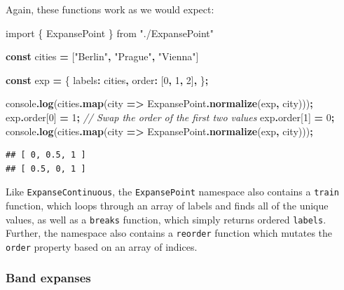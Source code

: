 \documentclass[
]{book}
\newenvironment{Shaded}{\begin{snugshade}}{\end{snugshade}}
\newcommand{\AttributeTok}[1]{\textcolor[rgb]{0.13,0.29,0.53}{#1}}
\newcommand{\BuiltInTok}[1]{#1}
\newcommand{\CommentTok}[1]{\textcolor[rgb]{0.56,0.35,0.01}{\textit{#1}}}
\newcommand{\DecValTok}[1]{\textcolor[rgb]{0.00,0.00,0.81}{#1}}
\newcommand{\FunctionTok}[1]{\textcolor[rgb]{0.13,0.29,0.53}{\textbf{#1}}}
\newcommand{\ImportTok}[1]{#1}
\newcommand{\KeywordTok}[1]{\textcolor[rgb]{0.13,0.29,0.53}{\textbf{#1}}}
\newcommand{\NormalTok}[1]{#1}
\newcommand{\OperatorTok}[1]{\textcolor[rgb]{0.81,0.36,0.00}{\textbf{#1}}}
\newcommand{\StringTok}[1]{\textcolor[rgb]{0.31,0.60,0.02}{#1}}
\theoremstyle{definition}
\theoremstyle{definition}
\theoremstyle{definition}
\theoremstyle{definition}
\theoremstyle{remark}
\begin{document}
Again, these functions work as we would expect:

\begin{Shaded}
\begin{Highlighting}[]
\ImportTok{import}\NormalTok{ \{ ExpansePoint \} }\ImportTok{from} \StringTok{"./ExpansePoint"}

\KeywordTok{const}\NormalTok{ cities }\OperatorTok{=}\NormalTok{ [}\StringTok{"Berlin"}\OperatorTok{,} \StringTok{"Prague"}\OperatorTok{,} \StringTok{"Vienna"}\NormalTok{]}

\KeywordTok{const}\NormalTok{ exp }\OperatorTok{=}\NormalTok{ \{}
\NormalTok{  labels}\OperatorTok{:}\NormalTok{ cities}\OperatorTok{,}
\NormalTok{  order}\OperatorTok{:}\NormalTok{ [}\DecValTok{0}\OperatorTok{,} \DecValTok{1}\OperatorTok{,} \DecValTok{2}\NormalTok{]}\OperatorTok{,}
\NormalTok{\}}\OperatorTok{;}

\BuiltInTok{console}\OperatorTok{.}\FunctionTok{log}\NormalTok{(cities}\OperatorTok{.}\FunctionTok{map}\NormalTok{(city }\KeywordTok{=\textgreater{}}\NormalTok{ ExpansePoint}\OperatorTok{.}\FunctionTok{normalize}\NormalTok{(exp}\OperatorTok{,}\NormalTok{ city)))}\OperatorTok{;}
\NormalTok{exp}\OperatorTok{.}\AttributeTok{order}\NormalTok{[}\DecValTok{0}\NormalTok{] }\OperatorTok{=} \DecValTok{1}\OperatorTok{;} \CommentTok{// Swap the order of the first two values}
\NormalTok{exp}\OperatorTok{.}\AttributeTok{order}\NormalTok{[}\DecValTok{1}\NormalTok{] }\OperatorTok{=} \DecValTok{0}\OperatorTok{;}
\BuiltInTok{console}\OperatorTok{.}\FunctionTok{log}\NormalTok{(cities}\OperatorTok{.}\FunctionTok{map}\NormalTok{(city }\KeywordTok{=\textgreater{}}\NormalTok{ ExpansePoint}\OperatorTok{.}\FunctionTok{normalize}\NormalTok{(exp}\OperatorTok{,}\NormalTok{ city)))}\OperatorTok{;}
\end{Highlighting}
\end{Shaded}

\begin{verbatim}
## [ 0, 0.5, 1 ]
## [ 0.5, 0, 1 ]
\end{verbatim}

Like \texttt{ExpanseContinuous}, the \texttt{ExpansePoint} namespace also contains a \texttt{train} function, which loops through an array of labels and finds all of the unique values, as well as a \texttt{breaks} function, which simply returns ordered \texttt{labels}. Further, the namespace also contains a \texttt{reorder} function which mutates the \texttt{order} property based on an array of indices.

\subsubsection{Band expanses}\label{band-expanses}
\end{document}
